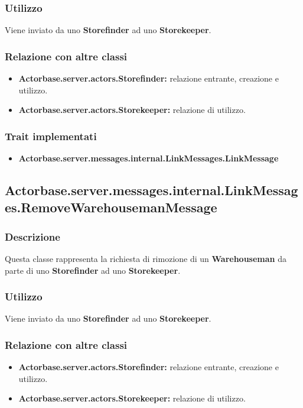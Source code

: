 \documentclass[a4paper]{article}
\begin{document}
			\subsubsection{Utilizzo}
				Viene inviato da uno \textbf{Storefinder} ad uno \textbf{Storekeeper}.
				
			\subsubsection{Relazione con altre classi}
				\begin{itemize}
					\item \textbf{Actorbase.server.actors.Storefinder:} relazione entrante, creazione e utilizzo.
					\item \textbf{Actorbase.server.actors.Storekeeper:} relazione di utilizzo.
				\end{itemize}
				
			\subsubsection{Trait implementati}
				\begin{itemize}
					\item \textbf{Actorbase.server.messages.internal.LinkMessages.LinkMessage} 
				\end{itemize}
				
		\subsection{Actorbase.server.messages.internal.LinkMessages.RemoveWarehousemanMessage}
			\subsubsection{Descrizione}
				Questa classe rappresenta la richiesta di rimozione di un \textbf{Warehouseman} da parte di uno \textbf{Storefinder} 
				ad uno \textbf{Storekeeper}.
				
			\subsubsection{Utilizzo}
				Viene inviato da uno \textbf{Storefinder} ad uno \textbf{Storekeeper}.
				
			\subsubsection{Relazione con altre classi}
				\begin{itemize}
					\item \textbf{Actorbase.server.actors.Storefinder:} relazione entrante, creazione e utilizzo.
					\item \textbf{Actorbase.server.actors.Storekeeper:} relazione di utilizzo.
				\end{itemize}
				
\end{document}
